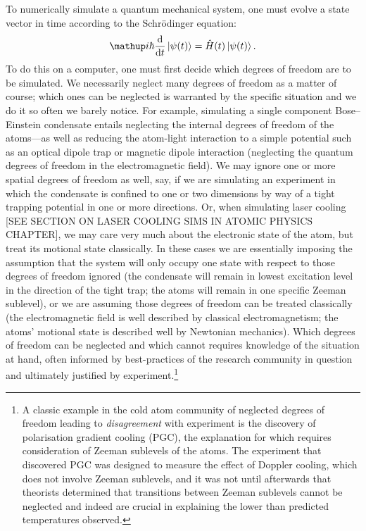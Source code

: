 To numerically simulate a quantum mechanical system, one must evolve a state vector in time according to the Schr\"odinger equation:
\begin{align}\label{eq:schrodinger_equation}
\ii\hbar\dv{t}\ket{\psi(t)} = \hat H (t) \ket{\psi(t)}.
\end{align}
To do this on a computer, one must first decide which degrees of freedom are to be simulated. We necessarily neglect many degrees of freedom as a matter of course; which ones can be neglected is warranted by the specific situation and we do it so often we barely notice. For example, simulating a single component Bose--Einstein condensate entails neglecting the internal degrees of freedom of the atoms---as well as reducing the atom-light interaction to a simple potential such as an optical dipole trap or magnetic dipole interaction (neglecting the quantum degrees of freedom in the electromagnetic field). We may ignore one or more spatial degrees of freedom as well, say, if we are simulating an experiment in which the condensate is confined to one or two dimensions \cite{gorlitz_realization_2001, hofferberth_non-equilibrium_2007, rauer_cooling_2016} by way of a tight trapping potential in one or more directions. Or, when simulating laser cooling [SEE SECTION ON LASER COOLING SIMS IN ATOMIC PHYSICS CHAPTER], we may care very much about the electronic state of the atom, but treat its motional state classically. In these cases we are essentially imposing the assumption that the system will only occupy one state with respect to those degrees of freedom ignored (the condensate will remain in lowest excitation level in the direction of the tight trap; the atoms will remain in one specific Zeeman sublevel), or we are assuming those degrees of freedom can be treated classically (the electromagnetic field is well described by classical electromagnetism; the atoms' motional state is described well by Newtonian mechanics). Which degrees of freedom can be neglected and which cannot requires knowledge of the situation at hand, often informed by best-practices of the research community in question and ultimately justified by experiment.\footnote{A classic example in the cold atom community of neglected degrees of freedom leading to \emph{disagreement} with experiment is the discovery of polarisation gradient cooling (\textsc{PGC}), the explanation for which requires consideration of Zeeman sublevels of the atoms. The experiment that discovered \textsc{PGC} \cite{lett_observation_1988} was designed to measure the effect of Doppler cooling, which does not involve Zeeman sublevels, and it was not until afterwards that theorists determined \cite{dalibard_laser_1989} that transitions between Zeeman sublevels cannot be neglected and indeed are crucial in explaining the lower than predicted temperatures observed.}


